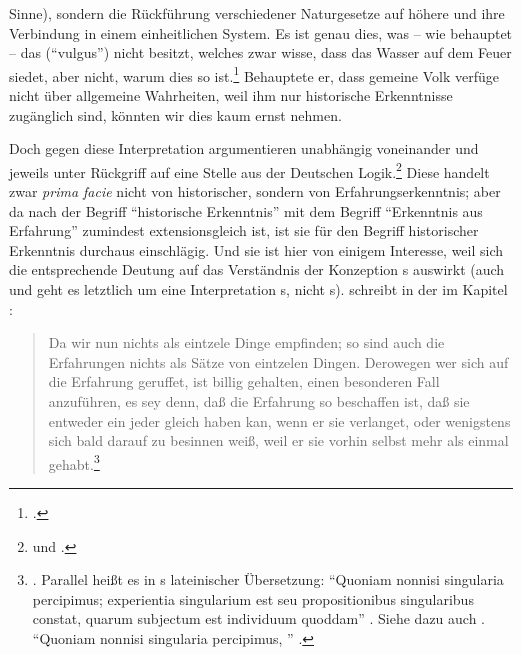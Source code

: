 Sinne), sondern die Rückführung verschiedener Naturgesetze auf höhere und ihre
Verbindung in einem einheitlichen System. Es ist genau dies, was -- wie
 behauptet -- das  (\enquote{vulgus}) nicht
besitzt, welches zwar wisse, dass das Wasser auf dem Feuer siedet, aber nicht,
warum dies so
ist.\footnote{\cite[Vgl.][\S~23]{Wolff:Discursuspraeliminarisdephilosophiaingenere1996}.}
Behauptete er, dass gemeine Volk verfüge nicht über allgemeine Wahrheiten, weil
ihm nur historische Erkenntnisse zugänglich sind, könnten wir dies kaum ernst
nehmen.



Doch gegen diese Interpretation argumentieren unabhängig voneinander
 und
 jeweils unter Rückgriff auf
eine Stelle aus der Deutschen
Logik.\footnote{\cite[Vgl.][\pno~57\,f.,]{Kambartel:ErfahrungundStruktur1968}
und \cite[][91]{Holzhey:KantsErfahrungsbegriff1970}.} Diese handelt zwar \emph{prima
facie} nicht von historischer, sondern von Erfahrungserkenntnis; aber da
nach  der Begriff \enquote{historische
Erkenntnis} mit dem Begriff \enquote{Erkenntnis aus Erfahrung} zumindest
extensionsgleich ist, ist sie für den Begriff historischer Erkenntnis durchaus
einschlägig. Und sie ist hier von einigem Interesse, weil sich die entsprechende
Deutung auf das Verständnis der Konzeption s auswirkt
(auch  und
 geht es letztlich um eine
Interpretation s, nicht
s).
 schreibt in der
 im Kapitel :
\begin{quote}\label{Zitat:Wolff:ErfahrungnurvoneinzelnenDingen}
 Da wir nun nichts als eintzele Dinge empfinden; so sind auch die Erfahrungen
nichts als Sätze von eintzelen Dingen. Derowegen wer sich auf die Erfahrung
geruffet, ist billig gehalten, einen besonderen Fall anzuführen, es sey denn,
daß die Erfahrung so beschaffen ist, daß sie entweder ein jeder gleich haben
kan, wenn er sie verlanget, oder wenigstens sich bald darauf zu besinnen weiß,
weil er sie vorhin selbst mehr als einmal gehabt.\footnote{\cite[][Capitel 5,
\S~2]{Wolff:VernuenftigeGedankenvondenKraeftendesmenschlichenVerstandesundihremrichtigenGebraucheinErkenntnisderWahrheit1978}.
Parallel heißt es in s lateinischer
Übersetzung: \enquote{Quoniam nonnisi singularia percipimus; experientia
singularium est seu propositionibus singularibus constat, quarum subjectum est
individuum quoddam} \parencite[][\S~119]{Wolff:Cogitationesrationalesdeviribusintellectushumani1983}.
Siehe dazu auch
\cite[][\S\S~664--667]{Wolff:PhilosophiarationalissiveLogica1740}.
\enquote{Quoniam nonnisi singularia percipimus, } \parencite[][\S~665]{Wolff:PhilosophiarationalissiveLogica1740}.}
\end{quote}
